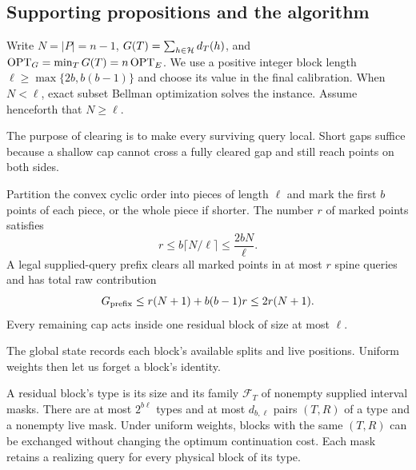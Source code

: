 \subsection{Supporting propositions and the algorithm}

Write $N=|P|=n-1$, $G(T)=\sum_{h\in\mathcal H}d_T(h)$, and
$\operatorname{OPT}_G=\min_TG(T)=n\operatorname{OPT}_E$. We use a positive integer block length
$\ell\ge\max\{2b,b(b-1)\}$ and choose its value in the final
calibration. When $N<\ell$, exact subset Bellman optimization solves the
instance. Assume henceforth that $N\ge\ell$.

The purpose of clearing is to make every surviving query local.
Short gaps suffice because a shallow cap cannot cross a fully
cleared gap and still reach points on both sides.

\begin{proposition}
\label{prop:uniform-cap-prefix}
Partition the convex cyclic order into pieces of length $\ell$ and
mark the first $b$ points of each piece, or the whole piece if shorter.
The number $r$ of marked points satisfies
\begin{equation}\label{eq:uniform-cap-deletion-count}
 r\le b\lceil N/\ell\rceil\le\frac{2bN}{\ell}.
\end{equation}
A legal supplied-query prefix clears all marked points in at most
$r$ spine queries and has total raw contribution
\begin{equation}\label{eq:uniform-cap-prefix-cost}
 G_{\rm prefix}\le r(N+1)+b(b-1)r\le2r(N+1).
\end{equation}
Every remaining cap acts inside one residual block of size at most
$\ell$.
\end{proposition}

The global state records each block's available splits and live
positions. Uniform weights then let us forget a block's identity.

\begin{proposition}
\label{prop:uniform-cap-types}
A residual block's type is its size and its family $\mathcal F_T$ of
nonempty supplied interval masks. There are at most $2^{b\ell}$ types
and at most $d_{b,\ell}$ pairs $(T,R)$ of a type and a nonempty live
mask. Under uniform weights, blocks with the same $(T,R)$ can be
exchanged without changing the optimum continuation cost. Each mask
retains a realizing query for every physical block of its type.
\end{proposition}

